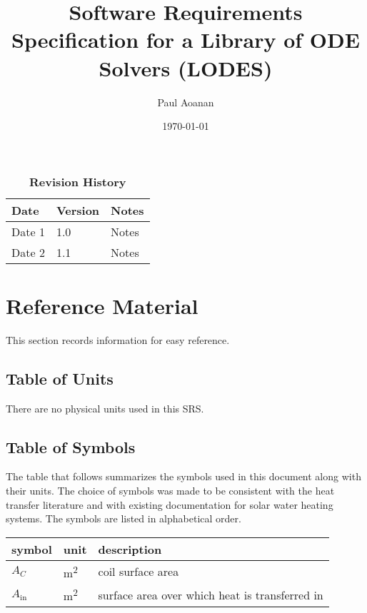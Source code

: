\documentclass[12pt]{article}
\newcommand{\progname}{LODES} %
\newcommand{\progdesc}{Library of ODE Solvers}
\begin{document}
\title{Software Requirements Specification for a \progdesc{} (\progname{})} 
\author{Paul Aoanan}
\date{\today}
	
\maketitle

\tableofcontents

\begin{table}[bp]
\caption{\bf Revision History}
\begin{tabularx}{\textwidth}{p{3cm}p{2cm}X}
\toprule {\bf Date} & {\bf Version} & {\bf Notes}\\
\midrule
Date 1 & 1.0 & Notes\\
Date 2 & 1.1 & Notes\\
\bottomrule
\end{tabularx}
\end{table}

\section{Reference Material}

This section records information for easy reference.

\subsection{Table of Units}

There are no physical units used in this SRS.

\subsection{Table of Symbols}

The table that follows summarizes the symbols used in this document along with
their units.  The choice of symbols was made to be consistent with the heat
transfer literature and with existing documentation for solar water heating
systems.  The symbols are listed in alphabetical order.

\renewcommand{\arraystretch}{1.2}
\noindent \begin{longtable*}{l l p{12cm}} \toprule
\textbf{symbol} & \textbf{unit} & \textbf{description}\\
\midrule 
$A_C$ & \si[per-mode=symbol] {\square\metre} & coil surface area
\\
$A_\text{in}$ & \si[per-mode=symbol] {\square\metre} & surface area over 
which heat is transferred in
\\ 
\bottomrule
\end{longtable*}
\end{document}
